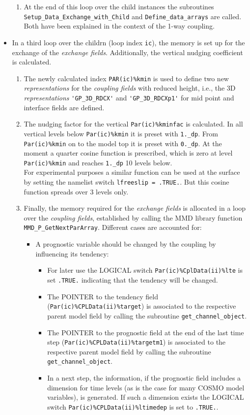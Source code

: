 \documentclass[11pt,twoside]{article}
\begin{document}
\begin{itemize}
\begin{enumerate}
\item At the end of this loop over the child instances the
subroutines \verb|Setup_Data_Exchange_with_Child|
and \verb|Define_data_arrays| are called. Both have been explained in the
context of the 1-way coupling.
\end{enumerate} %
\item In a third loop over the childrn (loop index \verb|ic|),
the memory is set up for the exchange of the {\it exchange
fields}. Additionally, the vertical nudging coefficient is calculated.
\begin{enumerate}%
\item The newly calculated index \verb|PAR(ic)%kmin| is used to define
two new {\it representations} for the {\it coupling fields} with reduced height,
i.e., the 3D {\it representations} \verb|'GP_3D_RDCX'|
and \verb|'GP_3D_RDCXp1'| for mid point and interface fields are defined.
\item The nudging factor for the vertical \verb|Par(ic)%kminfac| is
calculated. In all vertical levels
below \verb|Par(ic)%kmin| it is preset with \verb|1._dp|. 
From \verb|Par(ic)%kmin| on to the model top it is
preset with \verb|0._dp|. At the moment a quarter cosine function is
prescribed, which is
zero at level \verb|Par(ic)%kmin| and reaches \verb|1._dp| 10 levels below.\\
For experimental purposes a similar function can be used at the surface by
setting the namelist switch \verb|lfreeslip = .TRUE.|. But this cosine
function spreads over 3 levels only.

\item Finally, the memory required for the {\it exchange fields} is allocated
in a loop over the {\it coupling fields}, established by calling the MMD library
function \verb|MMD_P_GetNextParArray|. Different cases are accounted for:
\begin{itemize}%
\item A prognostic variable should be changed by the coupling by influencing
its  tendency:\\
\begin{itemize}%
\item For later use the {\footnotesize LOGICAL }switch \verb|Par(ic)%CplData(ii)%lte| is set 
\verb|.TRUE.| indicating that the tendency will be changed.
\item The {\footnotesize POINTER} to the tendency field (\verb|Par(ic)%CPLData(ii)%target|)
 is associated to the respective parent
 model field by calling the subroutine \verb|get_channel_object|.
\item The {\footnotesize POINTER} to the prognostic field at the end of the last time step
 (\verb|Par(ic)%CPLData(ii)%targetm1|) 
 is associated to the respective parent
 model field by calling the subroutine \verb|get_channel_object|.
\item In a next step, the information, if the prognostic field includes a
 dimension for time levels (as is the case for many COSMO model variables),
 is generated. If such a dimension exists the {\footnotesize LOGICAL }switch 
\verb|Par(ic)%CPLData(ii)%ltimedep| is set to \verb|.TRUE.|.
\end{itemize} %


\end{itemize}
\end{enumerate}
\end{itemize}
\end{document}
